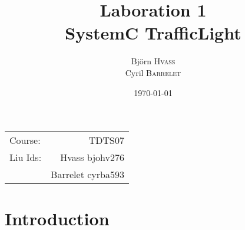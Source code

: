 \documentclass{article}
\title{Laboration 1 \\ SystemC TrafficLight} %
\author{
  Björn \textsc{Hvass}\\
  Cyril \textsc{Barrelet}
} %
\date{\today} %
\begin{document}
\maketitle %

\begin{center}
\begin{tabular}{l r}
Course: & TDTS07\\ %
Liu Ids: & Hvass bjohv276\\ %
& Barrelet cyrba593 \\
\end{tabular}
\end{center}


\pagebreak\section{Introduction}

\pagebreak
\pagebreak
\pagebreak
\pagebreak
\pagebreak






\end{document}
